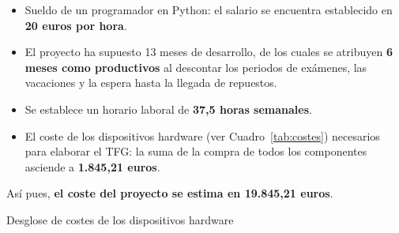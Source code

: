\begin{itemize}
\item Sueldo de un programador en Python: el salario se encuentra establecido en \textbf{20 euros por hora}.
\item El proyecto ha supuesto 13 meses de desarrollo, de los cuales se atribuyen \textbf{6 meses como productivos} al descontar los periodos de exámenes, las vacaciones y la espera hasta la llegada de repuestos.
\item Se establece un horario laboral de \textbf{37,5 horas semanales}.
\item El coste de los dispositivos hardware (ver Cuadro~\ref{tab:costes}) necesarios para elaborar el \acs{TFG}: la suma de la compra de todos los componentes asciende a \textbf{1.845,21 euros}.
\end{itemize}

Así pues, \textbf{el coste del proyecto se estima en 19.845,21 euros}.

\begin{table}[!h]
 \centering
 {\small
 
 }
 \caption[Desglose de costes de los dispositivos hardware]
 {Desglose de costes de los dispositivos hardware}
 \label{tab:costes}
\end{table}



